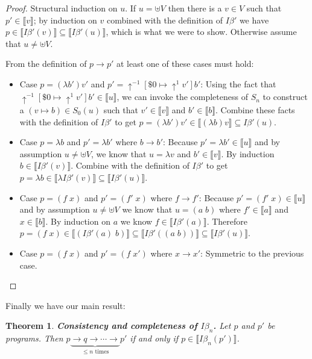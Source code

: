 \documentclass{article}
\newcommand{\denotation}[1]{{\llbracket #1 \rrbracket}}
\newcommand{\shift}[1]{\uparrow^{#1}}
\newcommand{\reduce}{\longrightarrow}
\newtheorem{theorem}{Theorem}
\begin{document}
\begin{proof}
  Structural induction on $u$.
  If $u = \uplus V$
  then there is a $v\in V$
      such that $p' \in \denotation{v}$;
      by induction on $v$ combined with the definition of $I\beta'$ we have $p\in \denotation{I\beta'(v)}\subseteq \denotation{I\beta'(u)}$,
      which is what we were to show.
      Otherwise assume that $u\not=\uplus V$.
  
  From the definition of $p\reduce p'$
  at least one of these cases must hold:
  \begin{itemize}
  \item Case $p = (\lambda b')v'$ and $p' = \shift{-1}[\$0\mapsto \shift{1}v']b'$:
    Using the fact that $\shift{-1}[\$0\mapsto \shift{1}v']b'\in \denotation{u}$, we can invoke the completeness of $S_n$ to construct a $(v\mapsto  b)\in S_0(u)$
    such that $v'\in \denotation{v}$
    and $b'\in \denotation{b}$.
    Combine these facts with the definition of $I\beta'$
    to get
    $p = (\lambda b')v'\in \denotation{(\lambda b)v}\subseteq I\beta'(u)$.
  \item Case $p = \lambda b$ and $p' = \lambda b'$ where
    $b\reduce b'$:
    Because $p' = \lambda b'\in \denotation{u}$
    and by assumption $u\not=\uplus V$,
    we know that $u = \lambda v$ and $b'\in \denotation{v}$. By
    induction $b\in \denotation{I\beta'(v)}$.
    Combine with the definition of $I\beta'$ to get $p = \lambda b \in \denotation{\lambda I\beta'(v)}\subseteq \denotation{I\beta'(u)}$.
  \item Case $p = (f\;x)$ and $p' = (f'\;x)$ where $f\reduce f'$:
    Because $p' = (f'\;x)\in \denotation{u}$
    and by assumption $u\not=\uplus V$
    we know that $u = (a\;b)$
    where $f'\in \denotation{a}$
    and $x\in \denotation{b}$.
    By induction on $a$
    we know
    $f\in \denotation{I\beta'(a)}$.
    Therefore
    $p = (f\;x)\in \denotation{(I\beta'(a)\; b)}\subseteq\denotation{I\beta'((a\;b))}\subseteq\denotation{I\beta'(u)}$.
  \item Case $p = (f\;x)$ and $p' = (f\;x')$ where $x\reduce x'$: Symmetric to the previous case.    
  \end{itemize}
\end{proof}
Finally we have our main result:
\begin{theorem}
  \textbf{Consistency and completeness of $I\beta_n$.}
  Let $p$ and $p'$
  be programs.
  Then $p\underbrace{\reduce q\reduce\cdots\reduce}_{\text{$\leq n$ times}} p'$  if and only
  if $p\in \denotation{I\beta_n(p')}$.
\end{theorem}
\end{document}
